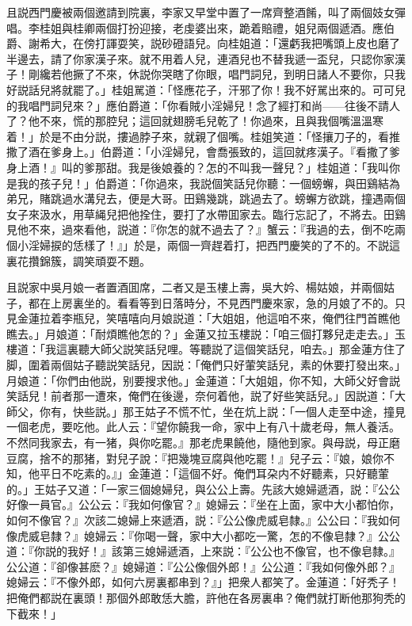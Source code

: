 且説西門慶被兩個邀請到院裏，李家又早堂中置了一席齊整酒餚，叫了兩個妓女彈唱。李桂姐與桂卿兩個打扮迎接，老虔婆出來，跪着賠禮，姐兒兩個遞酒。應伯爵、謝希大，在傍打諢耍笑，説砂磴語兒。向桂姐道：「還虧我把嘴頭上皮也磨了半邊去，請了你家漢子來。就不用着人兒，連酒兒也不替我遞一盃兒，只認你家漢子！剛纔若他撅了不來，休説你哭瞎了你眼，唱門詞兒，到明日諸人不要你，只我好説話兒將就罷了。」桂姐駡道：「怪應花子，汗邪了你！我不好駡出來的。可可兒的我唱門詞兒來？」應伯爵道：「你看賊小淫婦兒！念了經打和尚——往後不請人了？他不來，慌的那腔兒；這回就翅膀毛兒乾了！你過來，且與我個嘴溫溫寒着！」於是不由分説，摟過脖子來，就親了個嘴。桂姐笑道：「怪攘刀子的，看推撒了酒在爹身上。」伯爵道：「小淫婦兒，會喬張致的，這回就疼漢子。『看撒了爹身上酒！』叫的爹那甜。我是後娘養的？怎的不叫我一聲兒？」桂姐道：「我叫你是我的孩子兒！」伯爵道：「你過來，我説個笑話兒你聽：一個螃蠏，與田鷄結為弟兄，賭跳過水溝兒去，便是大哥。田鷄幾跳，跳過去了。螃蠏方欲跳，撞遇兩個女子來汲水，用草䋲兒把他拴住，要打了水帶囬家去。臨行忘記了，不將去。田鷄見他不來，過來看他，説道：『你怎的就不過去了？』蟹云：『我過的去，倒不吃兩個小淫婦捩的恁樣了！』」於是，兩個一齊趕着打，把西門慶笑的了不的。不説這裏花攢錦簇，調笑頑耍不題。

且説家中吳月娘一者置酒囬席，二者又是玉樓上壽，吳大妗、楊姑娘，并兩個姑子，都在上房裏坐的。看看等到日落時分，不見西門慶來家，急的月娘了不的。只見金蓮拉着李瓶兒，笑嘻嘻向月娘説道：「大姐姐，他這咱不來，俺們往門首瞧他瞧去。」月娘道：「耐煩瞧他怎的？」金蓮又拉玉樓説：「咱三個打夥兒走走去。」玉樓道：「我這裏聽大師父説笑話兒哩。等聽説了這個笑話兒，咱去。」那金蓮方住了脚，圍着兩個姑子聽説笑話兒，因説：「俺們只好葷笑話兒，素的休要打發出來。」月娘道：「你們由他説，别要搜求他。」金蓮道：「大姐姐，你不知，大師父好會説笑話兒！前者那一遭來，俺們在後邊，奈何着他，説了好些笑話兒。」因説道：「大師父，你有，快些説。」那王姑子不慌不忙，坐在炕上説：「一個人走至中途，撞見一個老虎，要吃他。此人云：『望你饒我一命，家中上有八十歲老母，無人養活。不然同我家去，有一猪，與你吃罷。』那老虎果饒他，隨他到家。與母説，母正磨豆腐，捨不的那猪，對兒子說：『把幾塊豆腐與他吃罷！』兒子云：『娘，娘你不知，他平日不吃素的。』」金蓮道：「這個不好。俺們耳朶内不好聽素，只好聽葷的。」王姑子又道：「一家三個媳婦兒，與公公上壽。先該大媳婦遞酒，説：『公公好像一員官。』公公云：『我如何像官？』媳婦云：『坐在上面，家中大小都怕你，如何不像官？』次該二媳婦上來遞酒，説：『公公像虎威皂隸。』公公曰：『我如何像虎威皂隸？』媳婦云：『你喝一聲，家中大小都吃一驚，怎的不像皂隸？』公公道：『你説的我好！』該第三媳婦遞酒，上來説：『公公也不像官，也不像皂隸。』公公道：『卻像甚麽？』媳婦道：『公公像個外郎！』公公道：『我如何像外郎？』媳婦云：『不像外郎，如何六房裏都串到？』」把衆人都笑了。金蓮道：「好秃子！把俺們都説在裏頭！那個外郎敢恁大膽，許他在各房裏串？俺們就打断他那狗秃的下截來！」

